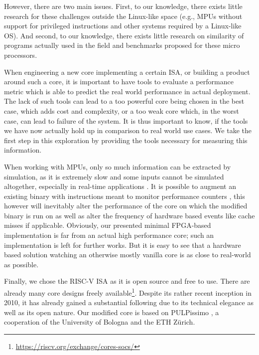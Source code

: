 \documentclass[../bachelor_paper.tex]{subfiles}
\begin{document}
However, there are two main issues. First, to our knowledge, there exists little research for these challenges outside the Linux-like space (e.g., \ac{MPU}s without support for privileged instructions and other systems required by a Linux-like \ac{OS}). And second, to our knowledge, there exists little research on similarity of programs actually used in the field and benchmarks proposed for these micro processors.

When engineering a new core implementing a certain \ac{ISA}, or building a product around such a core, it is important to have tools to evaluate a performance metric which is able to predict the real world performance in actual deployment. The lack of such tools can lead to a too powerful core being chosen in the best case, which adds cost and complexity, or a too weak core which, in the worst case, can lead to failure of the system. It is thus important to know, if the tools we have now actually hold up in comparison to real world use cases. We take the first step in this exploration by providing the tools necessary for measuring this information.

When working with \ac{MPU}s, only so much information can be extracted by simulation, as it is extremely slow \cite{eeckhoutDesigningComputerArchitecture2003,kaoHardwareApproachRealTime2007} and some inputs cannot be simulated altogether, especially in real-time applications \cite{kaoHardwareApproachRealTime2007}. It is possible to augment an existing binary with instructions meant to monitor performance counters \cite{eeckhoutQuantifyingImpactInput}, this however will inevitably alter the performance of the core on which the modified binary is run on as well as alter the frequency of hardware based events like cache misses if applicable. Obviously, our presented minimal FPGA-based implementation is far from an actual high performance core; such an implementation is left for further works. But it is easy to see that a hardware based solution watching an otherwise mostly vanilla core is as close to real-world as possible.

Finally, we chose the RISC-V ISA \cite{RISCVTechnicalSpecification} as it is open source and free to use. There are already many core designs freely available\footnote{\url{https://riscv.org/exchange/cores-socs/}}. Despite its rather recent inception in 2010, it has already gained a substantial following due to its technical elegance as well as its open nature. Our modified core is based on PULPissimo \cite{GitHubPulpplatformPulpissimo2021}, a cooperation of the University of Bologna and the ETH Z\"urich.
\end{document}
